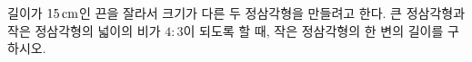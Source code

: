 길이가 $15\mkern3mu \mathrm{cm}$인 끈을 잘라서 크기가 다른 두 정삼각형을 만들려고 한다. 큰 정삼각형과 작은 정삼각형의 넓이의 비가 $4:3$이 되도록 할 때, 작은 정삼각형의 한 변의 길이를 구하시오.
